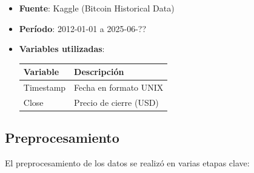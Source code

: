 \documentclass[12pt]{article}
\begin{document}
\begin{itemize}
\item \textbf{Fuente}: Kaggle (Bitcoin Historical Data)
\item \textbf{Período}: 2012-01-01 a 2025-06-?? %
\item \textbf{Variables utilizadas}:
\begin{table}[H]
\centering
\begin{tabular}{ll}
\toprule
\textbf{Variable} & \textbf{Descripción} \\
\midrule
Timestamp & Fecha en formato UNIX \\
Close & Precio de cierre (USD) \\
\bottomrule
\end{tabular}
\end{table}
\end{itemize}


\bigskip
\subsection{Preprocesamiento}

El preprocesamiento de los datos se realizó en varias etapas clave:
\end{document}
